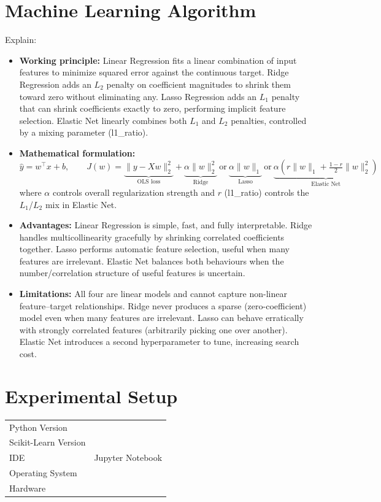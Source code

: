 \documentclass[12pt,a4paper]{article}
\begin{document}
\section{Machine Learning Algorithm}
Explain:
\begin{itemize}
\item \textbf{Working principle:} Linear Regression fits a linear combination of input
features to minimize squared error against the continuous target. Ridge Regression adds an
$L_2$ penalty on coefficient magnitudes to shrink them toward zero without eliminating any.
Lasso Regression adds an $L_1$ penalty that can shrink coefficients exactly to zero,
performing implicit feature selection. Elastic Net linearly combines both $L_1$ and $L_2$
penalties, controlled by a mixing parameter (l1\_ratio).
\item \textbf{Mathematical formulation:}
$$\hat{y} = w^\top x + b, \qquad
J(w) = \underbrace{\|y - Xw\|_2^2}_{\text{OLS loss}} + \underbrace{\alpha\|w\|_2^2}_{\text{Ridge}}
\ \text{or}\ \underbrace{\alpha\|w\|_1}_{\text{Lasso}}
\ \text{or}\ \underbrace{\alpha\left(r\|w\|_1 + \tfrac{1-r}{2}\|w\|_2^2\right)}_{\text{Elastic Net}}$$
where $\alpha$ controls overall regularization strength and $r$ (l1\_ratio) controls the
$L_1$/$L_2$ mix in Elastic Net.
\item \textbf{Advantages:} Linear Regression is simple, fast, and fully interpretable.
Ridge handles multicollinearity gracefully by shrinking correlated coefficients together.
Lasso performs automatic feature selection, useful when many features are irrelevant.
Elastic Net balances both behaviours when the number/correlation structure of useful features
is uncertain.
\item \textbf{Limitations:} All four are linear models and cannot capture non-linear
feature--target relationships. Ridge never produces a sparse (zero-coefficient) model even
when many features are irrelevant. Lasso can behave erratically with strongly correlated
features (arbitrarily picking one over another). Elastic Net introduces a second
hyperparameter to tune, increasing search cost.
\end{itemize}

\section{Experimental Setup}
\begin{tabular}{ll}
\toprule
Python Version & \\
Scikit-Learn Version & \\
IDE & Jupyter Notebook \\
Operating System & \\
Hardware & \\
\bottomrule
\end{tabular}
\end{document}
